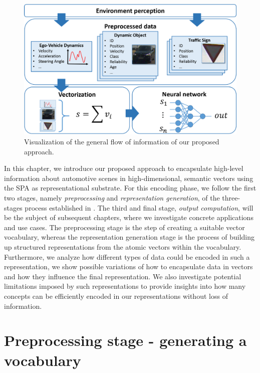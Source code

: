 \begin{figure}[t]
    \centering
    \includegraphics[width=0.8\linewidth]{imgs/system_overview_horizontal.eps}
    \caption{Visualization of the general flow of information of our proposed approach.}
    \label{fig:vectorization}
\end{figure}

In this chapter, we introduce our proposed approach to encapsulate high-level information about automotive scenes in high-dimensional, semantic vectors using the \ac{SPA} as representational substrate.
For this encoding phase, we follow the first two stages, namely \emph{preprocessing} and \emph{representation generation}, of the three-stages process established in \textcite{Gallant2013}.
The third and final stage, \emph{output computation}, will be the subject of subsequent chapters, where we investigate concrete applications and use cases.
The preprocessing stage is the step of creating a suitable vector vocabulary, whereas the representation generation stage is the process of building up structured representations from the atomic vectors within the vocabulary.
Furthermore, we analyze how different types of data could be encoded in such a representation, we show possible variations of how to encapsulate data in vectors and how they influence the final representation.
We also investigate potential limitations imposed by such representations to provide insights into how many concepts can be efficiently encoded in our representations without loss of information.  


\section{Preprocessing stage - generating a vocabulary}%
\label{sec:preprocessing_stage_generating_a_vocabulary}

